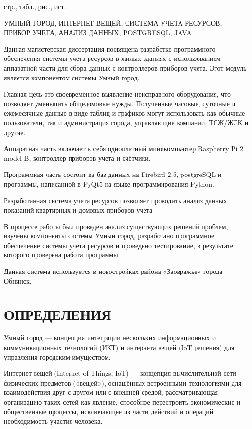 \documentclass[a4paper,12pt]{article}
\newcounter{mycitecount}                                %
\begin{document}
 стр.,  табл.,  рис., \totalmycitecounts ист. 

УМНЫЙ ГОРОД, ИНТЕРНЕТ ВЕЩЕЙ, СИСТЕМА УЧЕТА РЕСУРСОВ, ПРИБОР УЧЕТА, АНАЛИЗ ДАННЫХ, POSTGRESQL, JAVA

Данная магистерская диссертация посвящена разработке программного обеспечения системы учета ресурсов в жилых зданиях с использованием аппаратной части для сбора данных с контроллеров приборов учета. Этот модуль является компонентом системы Умный город. 

Главная цель это своевременное выявление неисправного оборудования, что позволяет уменьшить общедомовые нужды.
Полученные часовые, суточные и ежемесячные данные в виде таблиц и графиков могут использовать как обычные пользователи, так и администрация города, управляющие компании, ТСЖ/ЖСК и другие.

Аппаратная часть включает в себя одноплатный миникомпьютер Raspberry Pi 2 model B, контроллер приборов учета и счётчики.

Программная часть состоит из баз данных на Firebird 2.5, postgreSQL и программы, написанной в PyQt5 на языке программирования Python.

Разработанная система учета ресурсов позволяет проводить анализ данных показаний квартирных и домовых приборов учета

В процессе работы был проведен анализ существующих решений проблем, изучены компоненты системы Умный город, разработано программное обеспечение системы учета ресурсов и проведено тестирование, в результате которого проверена работа программы.

Данная система используется в новостройках района «Заовражье» города Обнинск.

\pagebreak
\thispagestyle{empty}

\section*{\centering ОПРЕДЕЛЕНИЯ}

Умный город --- концепция интеграции нескольких информационных и коммуникационных технологий (ИКТ) и интернета вещей (IoT решения) для управления городским имуществом.

Интернет вещей (Internet of Things, IoT) --- концепция вычислительной сети физических предметов («вещей»), оснащённых встроенными технологиями для взаимодействия друг с другом или с внешней средой, рассматривающая организацию таких сетей как явление, способное перестроить экономические и общественные процессы, исключающее из части действий и операций необходимость участия человека. 
\end{document}
